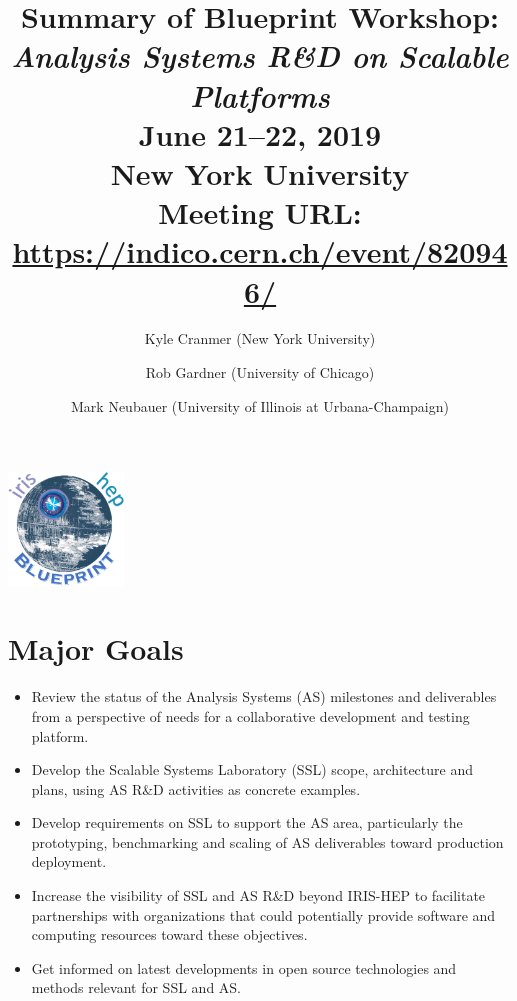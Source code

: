 \documentclass[11pt,letterpaper,fleqn]{article}
\date{} %
\title{\large Summary of Blueprint Workshop: \\
\vspace{1pt}
\LARGE \textit{Analysis Systems R\&D on Scalable Platforms} \\
\color{black} \normalsize
\vspace{10pt}
June 21--22, 2019 \\
New York University \\
Meeting URL: \href{https://indico.cern.ch/event/820946/}{https://indico.cern.ch/event/820946/}
} %
\author{Kyle Cranmer {\normalfont(New York University)}
      \and  Rob Gardner {\normalfont(University of Chicago)}
      \and  Mark Neubauer {\normalfont(University of Illinois at Urbana-Champaign)}
      }
\begin{document}
\maketitle %
\normalfont

\thispagestyle{firststyle}

\vspace{-250pt}
\hspace{360pt}
\includegraphics[height=30mm]{../../../figures/iris-hep-bluprint-logo.png}

\vspace{120pt}
\section*{Major Goals}
\vspace{3pt}
\begin{itemize}
  \item Review the status of the Analysis Systems (AS) milestones and deliverables from a perspective of needs for a collaborative development and testing platform.
  \item Develop the Scalable Systems Laboratory (SSL) scope, architecture and plans, using AS R\&D activities as concrete examples.
  \item Develop requirements on SSL to support the AS area, particularly the prototyping, benchmarking and scaling of AS deliverables toward production deployment.
  \item Increase the visibility of SSL and AS R\&D beyond IRIS-HEP to facilitate partnerships with organizations that could potentially provide software and computing resources toward these objectives.
  \item Get informed on latest developments in open source technologies and methods relevant for SSL and AS.
\end{itemize}
\end{document}
